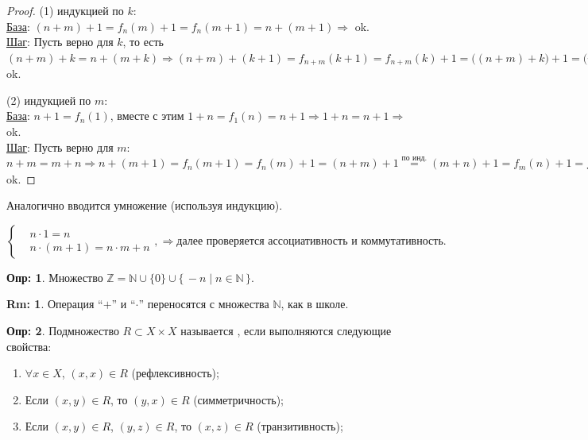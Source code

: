 \documentclass[12pt]{article}
\theoremstyle{definition}
\newtheorem{defn}{Опр:}
\newtheorem{rem}{Rm:}
\begin{document}
\begin{proof}
	(1) индукцией по $k$:\\
	\uline{База}: $(n + m) + 1 = f_n(m) + 1 = f_n(m+1) = n + (m+1) \Rightarrow$ ok.\\
	\uline{Шаг}: Пусть верно для $k$, то есть $(n+m) + k = n + (m+k) \Rightarrow (n + m) + (k + 1) = f_{n+m}(k+1) = f_{n+m}(k) + 1 = \big((n+m) + k \big) + 1 = \big(n + (m + k) \big) + 1 = f_n\big((m+k)\big) + 1 = f_n\big((m+k) + 1\big) = n + \big((m+k) + 1 \big) = n + \big( f_m(k) + 1 \big) \overset{\text{по инд.}}{=} n + \big( f_m(k+1) \big) = n + \big(m + (k+1) \big) \Rightarrow$ ok.
	
	
	(2) индукцией по $m$:\\
	\uline{База}: $n + 1 = f_n(1)$, вместе с этим $1 + n = f_1(n) = n + 1 \Rightarrow 1 + n = n + 1 \Rightarrow$ ok.\\
	\uline{Шаг}: Пусть верно для $m$: $n + m = m + n \Rightarrow n + (m + 1) = f_n(m+1) = f_n(m) + 1 = (n + m) + 1 \overset{\text{по инд.}}{=} (m + n) + 1 = f_m(n) + 1 = f_{m + 1}(n) = (m + 1) + n \Rightarrow$ ok.
\end{proof}

Аналогично вводится умножение (используя индукцию).

$\left\{ \begin{aligned}
	& n \cdot 1 = n\\
	& n \cdot (m + 1) = n \cdot m + n
\end{aligned}
\right., \Rightarrow \text{далее проверяется ассоциативность и коммутативность.}$


\begin{defn}
	Множество  $\mathbb{Z} = \mathbb{N} \cup \{0\} \cup \{\,-n \mid n \in \mathbb{N}\,\}$.
\end{defn}

\begin{rem}
	Операция ``$+$'' и ``$\cdot$'' переносятся с множества $\mathbb{N}$, как в школе.
\end{rem}

\begin{defn}
	Подмножество $R \subset X\times X$ называется , если выполняются следующие свойства:
	
	\begin{enumerate}[label={(\arabic*)}]
		\item $\forall x \in X$, $(x,x) \in R$ (рефлексивность);
		\item Если $(x,y) \in R$, то $(y,x) \in R$ (симметричность);
		\item Если $(x,y) \in R$, $(y,z) \in R$, то $(x,z) \in R$ (транзитивность);
	\end{enumerate}
\end{defn}
\end{document}
